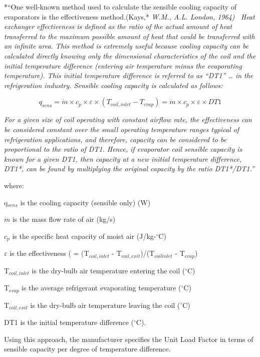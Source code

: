 *``One well-known method used to calculate the sensible cooling capacity of evaporators is the effectiveness method.(Kays,* \emph{W.M., A.L. London, 1964) ~Heat exchanger effectiveness is defined as the ratio of the actual amount of heat transferred to the maximum possible amount of heat that could be transferred with an infinite area. This method is extremely useful because cooling capacity can be calculated directly knowing only the dimensional characteristics of the coil and the initial temperature difference (entering air temperature minus the evaporating temperature). This initial temperature difference is referred to as ``DT1'' \ldots{} in the refrigeration industry. Sensible cooling capacity is calculated as follows:}

\begin{equation}
{q_{sens}} = \dot m \times {c_p} \times \varepsilon  \times ({T_{coil,inlet}} - {T_{evap}}) = \dot m \times {c_p} \times \varepsilon \times DT1
\end{equation}

\emph{For a given size of coil operating with constant airflow rate, the effectiveness can be considered constant over the small operating temperature ranges typical of refrigeration applications, and therefore, capacity can be considered to be proportional to the ratio of DT1. Hence, if evaporator coil sensible capacity is known for a given DT1, then capacity at a new initial temperature difference, DT1*, can be found by multiplying the original capacity by the ratio DT1*/DT1.''}

where:

q\(_{sens}\) is the cooling capacity (sensible only) (W)

\(\dot m\) is the mass flow rate of air (kg/s)

\({c_p}\) is the specific heat capacity of moist air (J/kg-\(^{\circ}\)C)

\(\varepsilon\) is the effectiveness ( = (T\(_{coil,inlet}\) - T\(_{coil,exit}\))/(T\(_{coilinlet}\) - T\(_{evap}\))

T\(_{coil,inlet}\) is the dry-bulb air temperature entering the coil (\(^{\circ}\)C)

T\(_{evap}\) is the average refrigerant evaporating temperature (\(^{\circ}\)C)

T\(_{coil,exit}\) is the dry-bulb air temperature leaving the coil (\(^{\circ}\)C)

DT1 is the initial temperature difference (\(^{\circ}\)C).

Using this approach, the manufacturer specifies the Unit Load Factor in terms of sensible capacity per degree of temperature difference.

